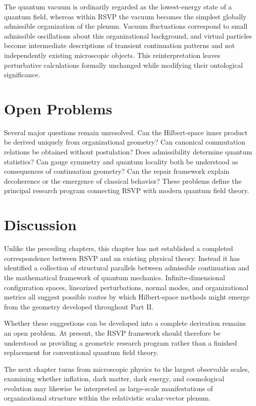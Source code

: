 \documentclass[11pt,oneside]{book}
\numberwithin{equation}{chapter}
\theoremstyle{definition}
\theoremstyle{plain}
\begin{document}
The quantum vacuum is ordinarily regarded as the lowest-energy state of a quantum field, whereas within RSVP the vacuum becomes the simplest globally admissible organization of the plenum. Vacuum fluctuations correspond to small admissible oscillations about this organizational background, and virtual particles become intermediate descriptions of transient continuation patterns and not independently existing microscopic objects. This reinterpretation leaves perturbative calculations formally unchanged while modifying their ontological significance.

\section{Open Problems}

Several major questions remain unresolved. Can the Hilbert-space inner product be derived uniquely from organizational geometry? Can canonical commutation relations be obtained without postulation? Does admissibility determine quantum statistics? Can gauge symmetry and quantum locality both be understood as consequences of continuation geometry? Can the repair framework explain decoherence or the emergence of classical behavior? These problems define the principal research program connecting RSVP with modern quantum field theory.

\section{Discussion}

Unlike the preceding chapters, this chapter has not established a completed
correspondence between RSVP and an existing physical theory. Instead it has
identified a collection of structural parallels between admissible
continuation and the mathematical framework of quantum mechanics.
Infinite-dimensional configuration spaces, linearized perturbations, normal
modes, and organizational metrics all suggest possible routes by which
Hilbert-space methods might emerge from the geometry developed throughout
Part II.

Whether these suggestions can be developed into a complete derivation
remains an open problem. At present, the RSVP framework should therefore be
understood as providing a geometric research program rather than a finished
replacement for conventional quantum field theory.

The next chapter turns from microscopic physics to the largest observable
scales, examining whether inflation, dark matter, dark energy, and
cosmological evolution may likewise be interpreted as large-scale
manifestations of organizational structure within the relativistic
scalar-vector plenum.
\end{document}
